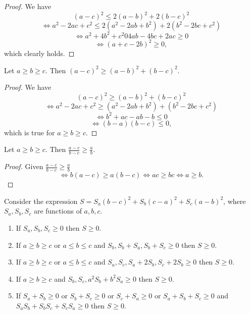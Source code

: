 \begin{proof}
  We have $$(a - c)^2\leq 2(a - b)^2 + 2(b - c)^2$$
  $$\Leftrightarrow a^2 - 2ac + c^2\leq 2(a^2 - 2ab + b^2) + 2(b^2 - 2bc +
  c^2)$$
  $$\Leftrightarrow a^2 + 4b^2 + c^2 0 4ab - 4bc + 2ac\geq 0$$
  $$\Leftrightarrow (a + c - 2b)^2\geq 0,$$
  which clearly holds.
\end{proof}

\begin{proposition}
  \label{pp:sos2}
  Let $a\geq b\geq c$. Then $(a - c)^2\geq (a - b)^2 + (b - c)^2$.
\end{proposition}

\begin{proof}
  We have $$(a - c)^2\geq (a - b)^2 + (b - c)^2$$
  $$\Leftrightarrow a^2 - 2ac + c^2 \geq (a^2 - 2ab + b^2) + (b^2 - 2bc + c^2)$$
  $$\Leftrightarrow b^2 + ac - ab - b \leq 0$$
  $$\Leftrightarrow (b - a)(b - c)\leq 0,$$
  which is true for $a\geq b\geq c$.
\end{proof}

\begin{proposition}
  \label{pp:sos3}
  Let $a\geq b\geq c$. Then $\frac{a - c}{b - c}\geq \frac{a}{b}$.
\end{proposition}

\begin{proof}
  Given $\frac{a - c}{b - c}\geq \frac{a}{b}$
  $$\Leftrightarrow b(a - c)\geq a(b - c)\Leftrightarrow ac\geq
  bc\Leftrightarrow a\geq b.$$
\end{proof}

\begin{theorem}
  Consider the expression $S = S_a(b - c)^2 + S_b(c - a)^2 + S_c(a - b)^2$,
  where $S_a, S_b, S_c$ are functions of $a, b, c$.
  \begin{enumerate}
  \item If $S_a, S_b, S_c\geq 0$ then $S\geq 0$.
  \item If $a\geq b\geq c$ or $a\leq b\leq c$ and $S_b, S_b + S_a, S_b + S_c\geq
    0$ then $S\geq 0$.
  \item If $a\geq b\geq c$ or $a\leq b\leq c$ and $S_a, S_c, S_a + 2S_b, S_c +
    2S_b \geq 0$ then $S\geq 0$.
  \item If $a\geq b\geq c$ and $S_b, S_c, a^2S_b + b^2S_a\geq 0$ then $S\geq 0$.
  \item If $S_a + S_b\geq 0$ or $S_b + S_c\geq 0$ or $S_c + S_a \geq 0$ or $S_a
    + S_b + S_c \geq 0$ and $S_aS_b + S_bS_c + S_cS_a\geq 0$ then $S\geq 0$.
  \end{enumerate}
\end{theorem}

